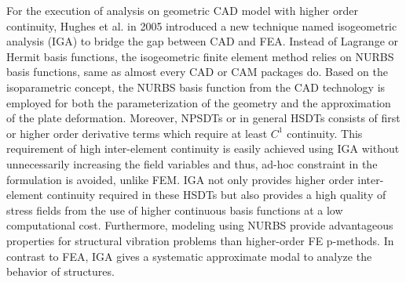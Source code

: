 \documentclass[3p,preprint,12pt]{elsarticle}
\begin{document}
For the execution of analysis on geometric CAD model with higher order continuity, Hughes et al. in 2005 introduced a new technique named isogeometric analysis (IGA) \cite{hughes2005isogeometric} to bridge the gap between CAD and FEA. Instead of Lagrange or Hermit basis functions, the isogeometric finite element method relies on NURBS basis functions, same as almost every CAD or CAM packages do. Based on the isoparametric concept, the NURBS basis function from the CAD technology is employed for both the parameterization of the geometry and the approximation of the plate deformation. Moreover, NPSDTs or in general HSDTs consists of first or higher order derivative terms which require at least $C^{1}$ continuity. This requirement of high inter-element continuity is easily achieved using IGA without unnecessarily increasing the field variables and thus, ad-hoc constraint in the formulation is avoided, unlike FEM. IGA not only provides higher order inter-element continuity required in these HSDTs but also provides a high quality of stress fields from the use of higher continuous basis functions at a low computational cost. Furthermore, modeling using NURBS provide advantageous properties for structural vibration problems than higher-order FE p-methods. In contrast to FEA, IGA gives a systematic approximate modal to analyze the behavior of structures. %
\end{document}
